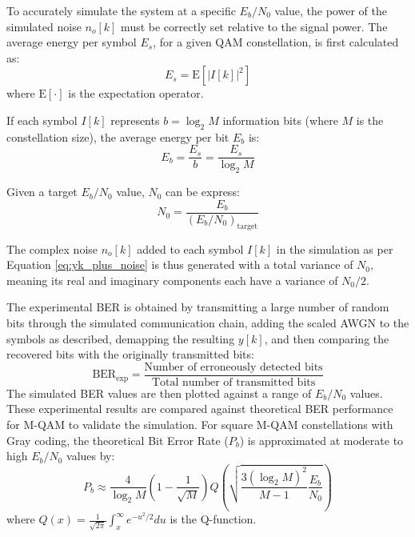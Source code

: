 To accurately simulate the system at a specific $E_b/N_0$ value, the power of the simulated noise $n_o[k]$ must be correctly set relative to the signal power. The average energy per symbol $E_s$, for a given QAM constellation, is first calculated as:
\begin{equation}
    E_s = \text{E}\left[|I[k]|^2\right]
\end{equation}
where $\text{E}[\cdot]$ is the expectation operator. 
\par
If each symbol $I[k]$ represents $b = \log_2 M$ information bits (where $M$ is the constellation size), the average energy per bit $E_b$ is:
\begin{equation}
    E_b = \frac{E_s}{b} = \frac{E_s}{\log_2 M}
\end{equation}
\par
Given a target $E_b/N_0$ value, $N_0$ can be express:
\begin{equation}
    N_0 = \frac{E_b}{(E_b/N_0)_{\text{target}}}
\end{equation}
\par
The complex noise $n_o[k]$ added to each symbol $I[k]$ in the simulation as per Equation \ref{eq:yk_plus_noise} is thus generated with a total variance of $N_0$, meaning its real and imaginary components each have a variance of $N_0/2$.

The experimental BER is obtained by transmitting a large number of random bits through the simulated communication chain, adding the scaled AWGN to the symbols as described, demapping the resulting $y[k]$, and then comparing the recovered bits with the originally transmitted bits:
\begin{equation}
    \text{BER}_{\text{exp}} = \frac{\text{Number of erroneously detected bits}}{\text{Total number of transmitted bits}}
\end{equation}
The simulated BER values are then plotted against a range of $E_b/N_0$ values. These experimental results are compared against theoretical BER performance for M-QAM to validate the simulation. For square M-QAM constellations with Gray coding, the theoretical Bit Error Rate ($P_b$) is approximated at moderate to high $E_b/N_0$ values by:
\begin{equation}
    P_b \approx \frac{4}{\log_2 M} \left(1 - \frac{1}{\sqrt{M}}\right) Q\left(\sqrt{\frac{3 (\log_2 M)^2}{M-1} \frac{E_b}{N_0}}\right)
    \label{eq:Pb_MQAM_Eb_cont_final}
\end{equation}
where $Q(x) = \frac{1}{\sqrt{2\pi}} \int_x^\infty e^{-u^2/2} du$ is the Q-function.

